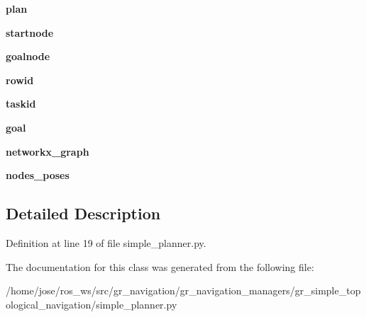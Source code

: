 \begin{DoxyCompactItemize}
\mbox{\label{classsimple__planner_1_1SimpleTopoPlanner_ab636b0a266a876b96c337b33aa8f2931}} 
{\bfseries plan}
\item 
\mbox{\label{classsimple__planner_1_1SimpleTopoPlanner_acb6a5a7d41195cdf9461a7910d29330e}} 
{\bfseries startnode}
\item 
\mbox{\label{classsimple__planner_1_1SimpleTopoPlanner_a1771fec278ab6ad5bcfa320edb3e92c5}} 
{\bfseries goalnode}
\item 
\mbox{\label{classsimple__planner_1_1SimpleTopoPlanner_ab5a9c64b9729b7fe10eacbcdf8eca00d}} 
{\bfseries rowid}
\item 
\mbox{\label{classsimple__planner_1_1SimpleTopoPlanner_a80017e7212588af3164e260ac15ecf14}} 
{\bfseries taskid}
\item 
\mbox{\label{classsimple__planner_1_1SimpleTopoPlanner_a275374762e8fe4b6372fd007789c191b}} 
{\bfseries goal}
\item 
\mbox{\label{classsimple__planner_1_1SimpleTopoPlanner_ad3949ed3ba9e27175f7ddea90344f6b4}} 
{\bfseries networkx\+\_\+graph}
\item 
\mbox{\label{classsimple__planner_1_1SimpleTopoPlanner_a76bfdc99608e2470adeba37535b207c2}} 
{\bfseries nodes\+\_\+poses}
\end{DoxyCompactItemize}


\subsection{Detailed Description}


Definition at line 19 of file simple\+\_\+planner.\+py.



The documentation for this class was generated from the following file\+:\begin{DoxyCompactItemize}
\item 
/home/jose/ros\+\_\+ws/src/gr\+\_\+navigation/gr\+\_\+navigation\+\_\+managers/gr\+\_\+simple\+\_\+topological\+\_\+navigation/simple\+\_\+planner.\+py\end{DoxyCompactItemize}
